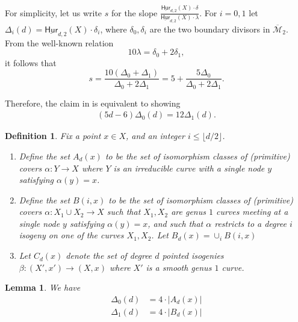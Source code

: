 \documentclass[reqno, 11pt]{amsart}
\newtheorem{lemma}[theorem]{Lemma}
\newtheorem{definition}[theorem]{Definition}
\newcommand{\Hurfixedtwo}{\underline{\mathsf{Hur}}_{d,2}(X)}
\begin{document}
For simplicity, let us write $s$ for the slope $\frac{\Hurfixedtwo \cdot \delta}{\Hurfixedtwo \cdot \lambda}$. For $i=0,1$ let $\Delta_{i}(d) = \Hurfixedtwo \cdot \delta_{i}$, where $\delta_{0},\delta_{i}$ are the two boundary divisors in $\overline{\mathcal{M}}_{2}$.  From the well-known relation \[10 \lambda = \delta_{0} + 2 \delta_{1},\] it follows that \[s = \frac{10(\Delta_{0}+\Delta_{1})}{\Delta_{0}+2\Delta_{1}} = 5 + \frac{5\Delta_{0}}{\Delta_{0}+2\Delta_{1}}.\]

Therefore, the claim in  is equivalent to showing 
\begin{align}
\label{equation:desired}
    (5d-6)\Delta_{0}(d) = 12\Delta_{1}(d).
\end{align}

\begin{definition}
    Fix a point $x \in X$, and an integer $i \leq \lfloor d/2 \rfloor$.  
    \begin{enumerate}
    
    \item Define the set $A_{d}(x)$ to be the set of isomorphism classes of (primitive) covers $\alpha: Y \to X$ where $Y$ is an irreducible curve with a single node $y$ satisfying $\alpha(y)=x$.
    
        \item Define the set $B(i,x)$ to be the set of isomorphism classes of (primitive) covers $\alpha: X_{1} \cup X_{2} \to X$ such that $X_{1},X_{2}$ are genus $1$ curves meeting at a single node $y$ satisfying $\alpha(y)=x$, and such that $\alpha$ restricts to a degree $i$ isogeny on one of the curves $X_{1},X_{2}$.  Let $B_{d}(x) = \cup_{i}B(i,x)$

        \item Let $C_{d}(x)$ denote the set of degree $d$ pointed isogenies $\beta: (X',x') \to (X,x)$ where $X'$ is a smooth genus $1$ curve.
        
    \end{enumerate}
\end{definition}


\begin{lemma}
    \label{lemma:Deltas} We have 
    \begin{align}
        \label{equation:Deltas} \Delta_{0}(d) &= 4 \cdot |A_{d}(x)| \\
        \Delta_{1}(d) &= 4 \cdot |B_{d}(x)| 
    \end{align}
\end{lemma}
\end{document}

